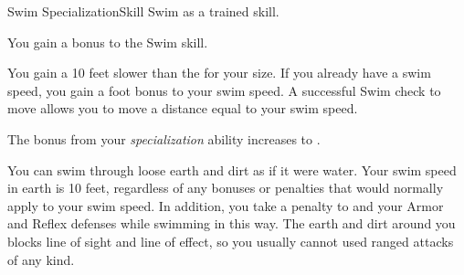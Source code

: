     \begin{feat}{Swim Specialization}{Skill}
        \featpre Swim as a trained skill.

         You gain a  bonus to the Swim skill.

         You gain a  10 feet slower than the  for your size.
        If you already have a swim speed, you gain a  foot bonus to your swim speed.
        A successful Swim check to move allows you to move a distance equal to your swim speed.

         The bonus from your \textit{specialization} ability increases to .

         You can swim through loose earth and dirt as if it were water.
        Your swim speed in earth is 10 feet, regardless of any bonuses or penalties that would normally apply to your swim speed.
        In addition, you take a  penalty to  and your Armor and Reflex defenses while swimming in this way.
        The earth and dirt around you blocks line of sight and line of effect, so you usually cannot used ranged attacks of any kind.
    \end{feat}

